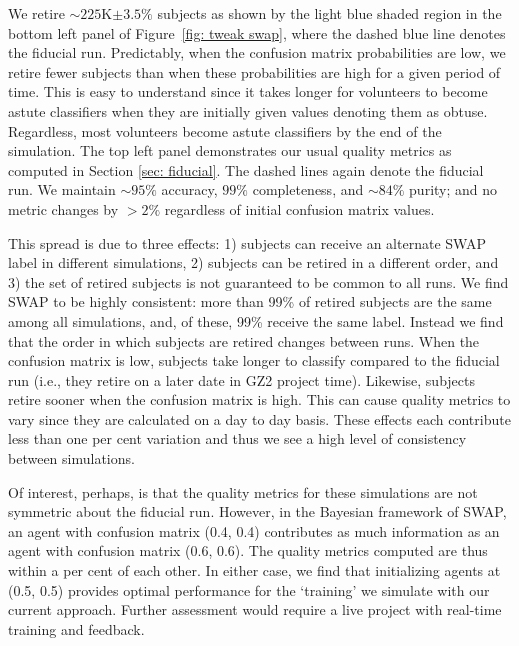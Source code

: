 We retire $\sim$$225$K$\pm3.5\%$ subjects as shown by the light blue shaded region in the bottom
left panel of Figure~\ref{fig: tweak swap}, where the dashed blue line denotes the fiducial run. 
Predictably, when the confusion matrix probabilities are low, we retire fewer subjects 
than when these probabilities are high for a given period of time. 
This is easy to understand since it takes longer for volunteers to become astute 
classifiers when they are initially given values denoting them as obtuse. 
Regardless, most volunteers become astute classifiers by the end of the simulation. 
The top left panel demonstrates our usual quality metrics as computed in Section \ref{sec: fiducial}.
The dashed lines again denote the fiducial run. 
We maintain $\sim$$95\%$ accuracy, $99\%$ completeness, and $\sim$$84\%$ purity;
 and no metric changes by $> 2\%$ regardless of initial confusion matrix values.  
 
This spread is due to three effects: 
1) subjects can receive an alternate SWAP label in different simulations, 
2) subjects can be retired in a different order, and 
3) the set of retired subjects is not guaranteed to be common to all runs. 
We find SWAP to be highly consistent: 
more than 99\% of retired subjects are the same among all simulations, 
and, of these, 99\% receive the same label.  Instead we find that the order in which 
subjects are retired changes between runs. 
When the confusion matrix is low, subjects take longer to classify compared to the fiducial run 
(i.e., they retire on a later date in GZ2 project time). 
Likewise, subjects retire sooner when the confusion matrix is high. 
This can cause quality metrics to vary since they are calculated on a day to day basis. 
These effects each contribute less than one per cent variation and thus we see a 
high level of consistency between simulations. 

Of interest, perhaps, is that the quality metrics for these simulations are not symmetric 
about the fiducial run. However, in the Bayesian framework of SWAP, an agent with 
confusion matrix (0.4, 0.4) contributes as much information as an agent with confusion matrix (0.6, 0.6).
The quality metrics computed are thus within a per cent of each other.
In either case, we find that initializing agents at (0.5, 0.5) provides optimal performance 
for the `training' we simulate with our current approach. Further assessment would 
require a live project with real-time training and feedback. 


